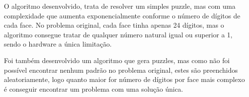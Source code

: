 O algoritmo desenvolvido, trata de resolver um simples puzzle, mas com uma complexidade que aumenta exponencialmente conforme o número de dígitos de cada face. No problema original, cada face tinha apenas 24 dígitos, mas o algoritmo consegue tratar de qualquer número natural igual ou superior a 1, sendo o hardware a única limitação.

Foi também desenvolvido um algoritmo que gera puzzles, mas como não foi possível encontrar nenhum padrão no problema original, estes são preenchidos aleatoriamente, logo quanto maior for número de dígitos por face mais complexo é conseguir encontrar um problema com uma solução única.

%
